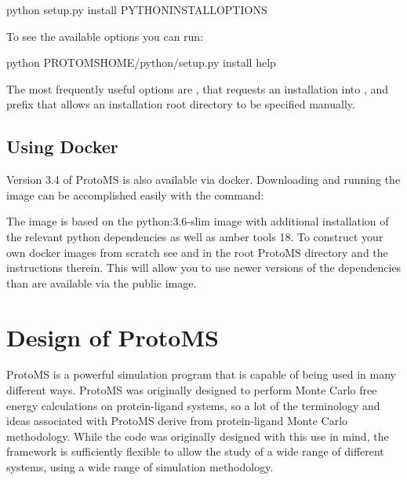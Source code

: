 \documentclass[letterpaper,10pt,english]{sphinxmanual}
\begin{document}
%
\begin{sphinxVerbatim}[commandchars=\\\{\}]
python setup.py install \PYGZdl{}PYTHON\PYGZus{}INSTALL\PYGZus{}OPTIONS
\end{sphinxVerbatim}

To see the available options you can run:

%
\begin{sphinxVerbatim}[commandchars=\\\{\}]
python \PYGZdl{}PROTOMSHOME/python/setup.py install \PYGZhy{}\PYGZhy{}help
\end{sphinxVerbatim}

The most frequently useful options are , that requests an installation into , and \textendash{}prefix that allows an installation root directory to be specified manually.


\section{Using Docker}
\label{\detokenize{compilation:using-docker}}\label{\detokenize{compilation:id1}}
Version 3.4 of ProtoMS is also available via docker. Downloading and running the image can be accomplished easily with the command:

%
\begin{sphinxVerbatim}[commandchars=\\\{\}]
   
\end{sphinxVerbatim}

The image is based on the python:3.6-slim image with additional installation of the relevant python dependencies as well as amber tools 18. To construct your own docker images from scratch see  and  in the root ProtoMS directory and the instructions therein. This will allow you to use newer versions of the dependencies than are available via the public image.


\chapter{Design of ProtoMS}
\label{\detokenize{protoms:design-of-protoms}}\label{\detokenize{protoms::doc}}
\ignorespaces 
ProtoMS is a powerful simulation program that is capable of being used in many different ways. ProtoMS was originally designed to perform Monte Carlo free energy calculations on protein-ligand systems, so a lot of the terminology and ideas associated with ProtoMS derive from protein-ligand Monte Carlo methodology. While the code was originally designed with this use in mind, the framework is sufficiently flexible to allow the study of a wide range of different systems, using a wide range of simulation methodology.
\end{document}
